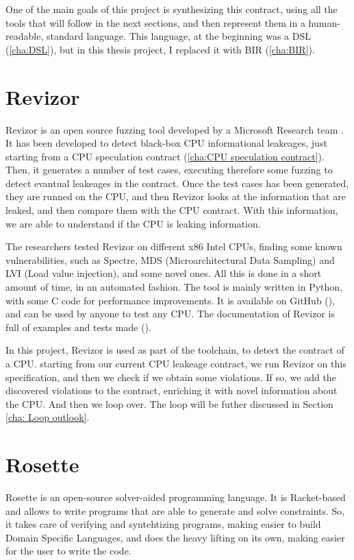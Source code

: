 One of the main goals of this project is synthesizing this contract, using all the
tools that will follow in the next sections, and then represent them in a human-readable,
standard language. This language, at the beginning was a DSL (\ref{cha:DSL}),
but in this thesis project, I replaced it with BIR (\ref{cha:BIR}).

\section{Revizor}
\label{cha:Revizor} Revizor is an open source fuzzing tool developed by a Microsoft
Research team \cite{article}. It has been developed to detect black-box CPU
informational leakeages, just starting from a CPU speculation contract (\ref{cha:CPU
speculation contract}). Then, it generates a number of test cases, executing
therefore some fuzzing to detect evantual leakeages in the contract. Once the test
cases has been generated, they are runned on the CPU, and then Revizor looks at the
information that are leaked, and then compare them with the CPU contract. With this
information, we are able to understand if the CPU is leaking information.

The researchers tested Revizor on different x86 Intel CPUs, finding some known vulnerabilities,
such as Spectre, MDS (Microarchitectural Data Sampling) and LVI (Load value
injection), and some novel ones. All this is done in a short amount of time, in
an automated fashion. The tool is mainly written in Python, with some C code for
performance improvements. It is available on GitHub (\cite{repo}), and can be
used by anyone to test any CPU. The documentation of Revizor is full of examples
and tests made (\cite{misc}).

In this project, Revizor is used as part of the toolchain, to detect the contract
of a CPU. starting from our current CPU leakeage contract, we run Revizor on this
specification, and then we check if we obtain some violations. If so, we add the
discovered violations to the contract, enriching it with novel information about
the CPU. And then we loop over. The loop will be futher discussed in Section \ref{cha:
Loop outlook}.

\section{Rosette}
\label{cha:Rosette} Rosette is an open-source solver-aided programming language.
It is Racket-based and allows to write programs that are able to generate and
solve constraints. So, it takes care of verifying and syntehtizing programs, making
easier to build Domain Specific Languages, and does the heavy lifting on its own,
making easier for the user to write the code.


